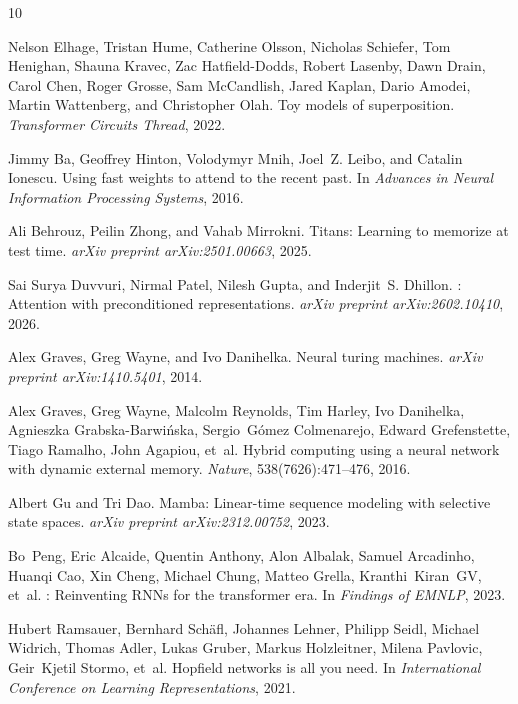 \documentclass{article}
\begin{document}
\begin{thebibliography}{10}

Nelson Elhage, Tristan Hume, Catherine Olsson, Nicholas Schiefer, Tom Henighan, Shauna Kravec, Zac Hatfield-Dodds, Robert Lasenby, Dawn Drain, Carol Chen, Roger Grosse, Sam McCandlish, Jared Kaplan, Dario Amodei, Martin Wattenberg, and Christopher Olah.
\newblock Toy models of superposition.
\newblock \emph{Transformer Circuits Thread}, 2022.

Jimmy Ba, Geoffrey Hinton, Volodymyr Mnih, Joel~Z. Leibo, and Catalin Ionescu.
\newblock Using fast weights to attend to the recent past.
\newblock In \emph{Advances in Neural Information Processing Systems}, 2016.

Ali Behrouz, Peilin Zhong, and Vahab Mirrokni.
\newblock Titans: Learning to memorize at test time.
\newblock \emph{arXiv preprint arXiv:2501.00663}, 2025.

Sai Surya Duvvuri, Nirmal Patel, Nilesh Gupta, and Inderjit~S. Dhillon.
: Attention with preconditioned representations.
\newblock \emph{arXiv preprint arXiv:2602.10410}, 2026.

Alex Graves, Greg Wayne, and Ivo Danihelka.
\newblock Neural turing machines.
\newblock \emph{arXiv preprint arXiv:1410.5401}, 2014.

Alex Graves, Greg Wayne, Malcolm Reynolds, Tim Harley, Ivo Danihelka,
  Agnieszka Grabska-Barwi{\'n}ska, Sergio~G{\'o}mez Colmenarejo, Edward
  Grefenstette, Tiago Ramalho, John Agapiou, et~al.
\newblock Hybrid computing using a neural network with dynamic external memory.
\newblock \emph{Nature}, 538(7626):471--476, 2016.

Albert Gu and Tri Dao.
\newblock Mamba: Linear-time sequence modeling with selective state spaces.
\newblock \emph{arXiv preprint arXiv:2312.00752}, 2023.

Bo~Peng, Eric Alcaide, Quentin Anthony, Alon Albalak, Samuel Arcadinho,
  Huanqi Cao, Xin Cheng, Michael Chung, Matteo Grella, Kranthi~Kiran~GV,
  et~al.
: Reinventing {RNN}s for the transformer era.
\newblock In \emph{Findings of EMNLP}, 2023.

Hubert Ramsauer, Bernhard Sch{\"a}fl, Johannes Lehner, Philipp Seidl, Michael
  Widrich, Thomas Adler, Lukas Gruber, Markus Holzleitner, Milena Pavlovic,
  Geir~Kjetil Stormo, et~al.
\newblock Hopfield networks is all you need.
\newblock In \emph{International Conference on Learning Representations}, 2021.


\end{thebibliography}
\end{document}
